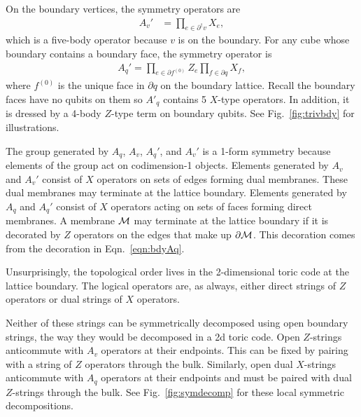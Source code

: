 \documentclass[twocolumn, longbibliography]{revtex4-2}
\newcommand{\pardag}{\partial^\dagger\!}
\begin{document}
On the boundary vertices, the symmetry operators are 
\begin{align}
A_v' &= \prod_{e\in\pardag v} X_e,
\end{align}
which is a five-body operator because $v$ is on the boundary.
For any cube whose boundary contains a boundary face, the symmetry operator is
\begin{align}
A_q' = \prod_{e\in \partial f^{(0)}}Z_e\prod_{f\in \partial q}X_f,\label{eqn:bdyAq}
\end{align}
where $f^{(0)}$ is the unique face in $\partial q$ on the boundary lattice. Recall the boundary faces have no qubits on them so $A'_q$ contains 5 $X$-type operators. In addition, it is dressed by a 4-body $Z$-type term on boundary qubits. See Fig.~\ref{fig:trivbdy} for illustrations.

The group generated by $A_q$, $A_v$, $A_q'$, and $A_v'$ is a 1-form symmetry because elements of the group act on codimension-1 objects. Elements generated by $A_v$ and $A_v'$ consist of $X$ operators on sets of edges forming dual membranes. These dual membranes may terminate at the lattice boundary.
Elements generated by $A_q$ and $A_q'$ consist of $X$ operators acting on sets of faces forming direct membranes. A membrane $\cal{M}$ may terminate at the lattice boundary if it is decorated by $Z$ operators on the edges that make up $\partial\cal{M}$. This decoration comes from the decoration in Eqn.~\ref{eqn:bdyAq}.

Unsurprisingly, the topological order lives in the 2-dimensional toric code at the lattice boundary. The logical operators are, as always, either direct strings of $Z$ operators or dual strings of $X$ operators. 


Neither of these strings can be symmetrically decomposed using open boundary strings, the way they would be decomposed in a 2d toric code. Open $Z$-strings anticommute with $A_v$ operators at their endpoints. This can be fixed by pairing with a string of $Z$ operators through the bulk. Similarly, open dual $X$-strings anticommute with $A_q$ operators at their endpoints and must be paired with dual $Z$-strings through the bulk. See Fig.~\ref{fig:symdecomp} for these local symmetric decompositions.
\end{document}
